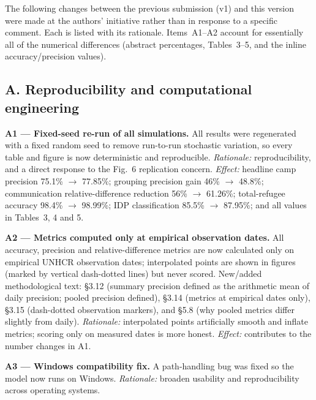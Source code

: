 \documentclass[11pt,a4paper]{article}
\begin{document}
The following changes between the previous submission (v1) and this version were made at the authors'
initiative rather than in response to a specific comment. Each is listed with its rationale. Items~A1--A2
account for essentially all of the numerical differences (abstract percentages, Tables~3--5, and the inline
accuracy/precision values).

\subsection*{A. Reproducibility and computational engineering}

\begin{authorbox}
\textbf{A1 --- Fixed-seed re-run of all simulations.} All results were regenerated with a fixed random seed to
remove run-to-run stochastic variation, so every table and figure is now deterministic and reproducible.
\emph{Rationale:} reproducibility, and a direct response to the Fig.~6 replication concern. \emph{Effect:}
headline camp precision 75.1\% $\rightarrow$ 77.85\%; grouping precision gain 46\% $\rightarrow$ 48.8\%;
communication relative-difference reduction 56\% $\rightarrow$ 61.26\%; total-refugee accuracy 98.4\%
$\rightarrow$ 98.99\%; IDP classification 85.5\% $\rightarrow$ 87.95\%; and all values in Tables~3, 4 and 5.
\end{authorbox}

\begin{authorbox}
\textbf{A2 --- Metrics computed only at empirical observation dates.} All accuracy, precision and
relative-difference metrics are now calculated only on empirical UNHCR observation dates; interpolated points are
shown in figures (marked by vertical dash-dotted lines) but never scored. New/added methodological text:
§3.12 (summary precision defined as the arithmetic mean of daily precision; pooled precision defined), §3.14
(metrics at empirical dates only), §3.15 (dash-dotted observation markers), and §5.8 (why pooled metrics differ
slightly from daily). \emph{Rationale:} interpolated points artificially smooth and inflate metrics; scoring only
on measured dates is more honest. \emph{Effect:} contributes to the number changes in A1.
\end{authorbox}

\begin{authorbox}
\textbf{A3 --- Windows compatibility fix.} A path-handling bug was fixed so the model now runs on Windows.
\emph{Rationale:} broaden usability and reproducibility across operating systems.
\end{authorbox}
\end{document}
